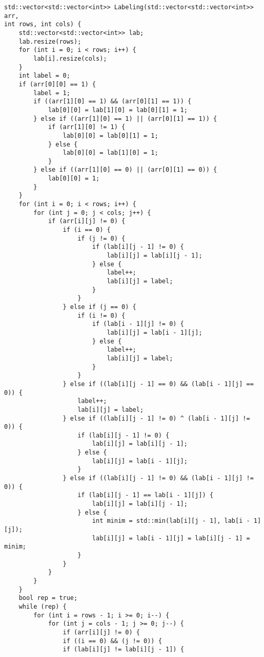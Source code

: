 \documentclass{report}
\begin{document}
\begin{lstlisting}
std::vector<std::vector<int>> Labeling(std::vector<std::vector<int>> arr,
int rows, int cols) {
    std::vector<std::vector<int>> lab;
    lab.resize(rows);
    for (int i = 0; i < rows; i++) {
        lab[i].resize(cols);
    }
    int label = 0;
    if (arr[0][0] == 1) {
        label = 1;
        if ((arr[1][0] == 1) && (arr[0][1] == 1)) {
            lab[0][0] = lab[1][0] = lab[0][1] = 1;
        } else if ((arr[1][0] == 1) || (arr[0][1] == 1)) {
            if (arr[1][0] != 1) {
                lab[0][0] = lab[0][1] = 1;
            } else {
                lab[0][0] = lab[1][0] = 1;
            }
        } else if ((arr[1][0] == 0) || (arr[0][1] == 0)) {
            lab[0][0] = 1;
        }
    }
    for (int i = 0; i < rows; i++) {
        for (int j = 0; j < cols; j++) {
            if (arr[i][j] != 0) {
                if (i == 0) {
                    if (j != 0) {
                        if (lab[i][j - 1] != 0) {
                            lab[i][j] = lab[i][j - 1];
                        } else {
                            label++;
                            lab[i][j] = label;
                        }
                    }
                } else if (j == 0) {
                    if (i != 0) {
                        if (lab[i - 1][j] != 0) {
                            lab[i][j] = lab[i - 1][j];
                        } else {
                            label++;
                            lab[i][j] = label;
                        }
                    }
                } else if ((lab[i][j - 1] == 0) && (lab[i - 1][j] == 0)) {
                    label++;
                    lab[i][j] = label;
                } else if ((lab[i][j - 1] != 0) ^ (lab[i - 1][j] != 0)) {
                    if (lab[i][j - 1] != 0) {
                        lab[i][j] = lab[i][j - 1];
                    } else {
                        lab[i][j] = lab[i - 1][j];
                    }
                } else if ((lab[i][j - 1] != 0) && (lab[i - 1][j] != 0)) {
                    if (lab[i][j - 1] == lab[i - 1][j]) {
                        lab[i][j] = lab[i][j - 1];
                    } else {
                        int minim = std::min(lab[i][j - 1], lab[i - 1][j]);
                        lab[i][j] = lab[i - 1][j] = lab[i][j - 1] = minim;
                    }
                }
            }
        }
    }
    bool rep = true;
    while (rep) {
        for (int i = rows - 1; i >= 0; i--) {
            for (int j = cols - 1; j >= 0; j--) {
                if (arr[i][j] != 0) {
                if ((i == 0) && (j != 0)) {
                if (lab[i][j] != lab[i][j - 1]) {

\end{lstlisting}
\end{document}
